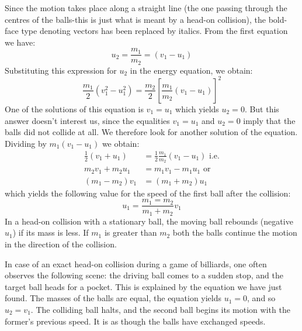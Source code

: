 Since the motion takes place along a straight line (the
one passing through the centres of the balls-this is just
what is meant by a head-on collision), the bold-face type
denoting vectors has been replaced by italics. From the first equation we have:
\begin{equation*}%
u_{2} = \frac{m_{1}}{m_{2}} = (v_{1} - u_{1})
\end{equation*}
Substituting this expression for $u_{2}$ in the energy equation, we obtain:
\begin{equation*}%
\frac{m_{1}}{2}(v_{1}^{2} - u_{1}^{2})=\frac{m_{2}}{2} \left[ \frac{m_{1}}{m_{2}}(v_{1} - u_{1}) \right]^{2}
\end{equation*}
One of the solutions of this equation is $v_{1} = u_{1}$ which
yields $u_{2} = 0$. But this answer doesn't interest us, since
the equalities $v_{1} = u_{1}$ and $u_{2} = 0$ imply that the balls
did not collide at all. We therefore look for another solution of the equation. Dividing by $m_{1} (v_{1} - u_{1})$ we obtain:
\begin{align*}
\frac{1}{2} (v_{1} + u_{1}) & = \frac{1}{2}\frac{m_{1}}{m_{2}} (v_{1} - u_{1}) \,\, \textrm{i.e.}\\
m_{2}v_{1} + m_{2}u_{1} & = m_{1}v_{1} - m_{1}u_{1} \,\, \textrm{or} \\
(m_{1} - m_{2}) v_{1} &= (m_{1} + m_{2})u_{1}
\end{align*}
which yields the following value for the speed of the first
ball after the collision:
\begin{equation*}%
u_{1} = \frac{m_{1}=m_{2}}{m_{1}+m_{2}}v_{1}
\end{equation*}
In a head-on collision with a stationary ball, the moving ball rebounds (negative $u_{1}$) if its mass is less. If $m_{1}$ is greater than $m_{2}$ both the balls continue the motion in the direction of the collision.

In case of an exact head-on collision during a game of
billiards, one often observes the following scene: the
driving ball comes to a sudden stop, and the target ball
heads for a pocket. This is explained by the equation we
have just found. The masses of the balls are equal, the
equation yields $u_{1} = 0$, and so $u_{2} = v_{1}$. The colliding
ball halts, and the second ball begins its motion with the
former's previous speed. It is as though the balls have
exchanged speeds.


